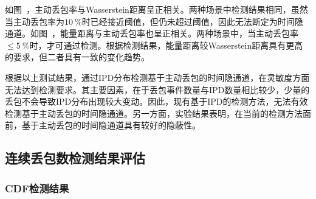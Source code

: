 如图\ ，主动丢包率与Wasserstein距离呈正相关。两种场景中检测结果相同，虽然当主动丢包率为$10\ \%$时已经接近阈值，但仍未超过阈值，因此无法断定为时间隐通道。如图\ ，能量距离与主动丢包率也呈正相关。两种场景中，当主动丢包率$\le 5\ \%$时，才可通过检测。根据检测结果，能量距离较Wasserstein距离具有更高的要求，但二者具有一致的变化趋势。

根据以上测试结果，通过IPD分布检测基于主动丢包的时间隐通道，在灵敏度方面无法达到检测要求。其主要因素，在于丢包事件数量与IPD数量相比较少，少量的丢包不会导致IPD分布出现较大变动。因此，现有基于IPD的检测方法，无法有效检测基于主动丢包的时间隐通道。另一方面，实验结果表明，在当前的检测方法面前，基于主动丢包的时间隐通道具有较好的隐蔽性。

\subsection{连续丢包数检测结果评估}
\label{chap:analyze:result:burst}

\subsubsection{CDF检测结果}
\label{chap:analyze:result:burst:cdf}


